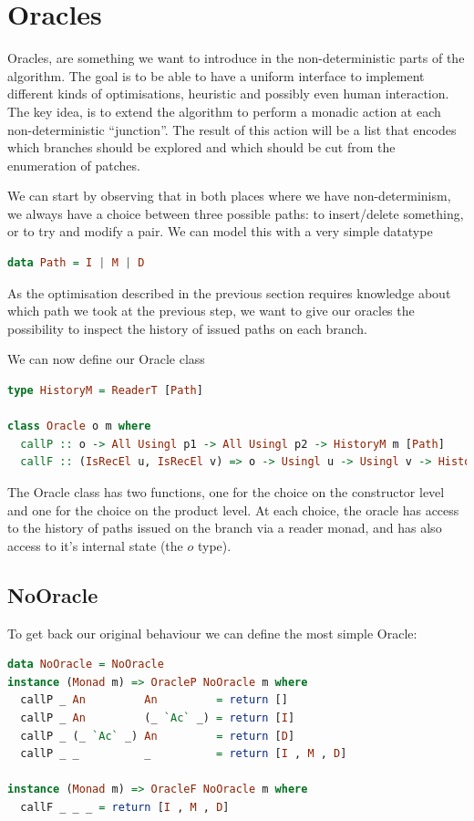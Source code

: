 \documentclass[11pt]{article}
\begin{document}
\section{Oracles}
Oracles, are something we want to introduce in the non-deterministic parts of 
the algorithm. The goal is to be able to have a uniform interface to implement 
different kinds of optimisations, heuristic and possibly even human interaction. 
The key idea, is to extend the algorithm to perform a monadic action at each 
non-deterministic ``junction''. The result of this action will be a list that 
encodes which branches should be explored and which should be cut from the enumeration of patches.

We can start by observing that in both places where we have non-determinism, we always have a 
choice between three possible paths: to insert/delete something, or to try and 
modify a pair. We can model this with a very simple datatype

\begin{lstlisting}[language=haskell]
  data Path = I | M | D 
\end{lstlisting}

As the optimisation described in the previous section requires knowledge about 
which path we took at the previous step, we want to give our oracles the 
possibility to inspect the history of issued paths on each branch.

We can now define our Oracle class

\begin{lstlisting}[language=haskell]
type HistoryM = ReaderT [Path]

class Oracle o m where
  callP :: o -> All Usingl p1 -> All Usingl p2 -> HistoryM m [Path]
  callF :: (IsRecEl u, IsRecEl v) => o -> Usingl u -> Usingl v -> HistoryM m [Path]
\end{lstlisting}

The Oracle class has two functions, one for the choice on the constructor level 
and one for the choice on the product level. At each choice, the oracle has 
access to the history of paths issued on the branch via a reader monad, and 
has also access to it's internal state (the $o$ type).
 
 \subsection{NoOracle}
To get back our original behaviour we can define the most simple Oracle:

\begin{lstlisting}[language=haskell]
data NoOracle = NoOracle
instance (Monad m) => OracleP NoOracle m where
  callP _ An         An         = return []
  callP _ An         (_ `Ac` _) = return [I]
  callP _ (_ `Ac` _) An         = return [D]
  callP _ _          _          = return [I , M , D]

instance (Monad m) => OracleF NoOracle m where
  callF _ _ _ = return [I , M , D]
\end{lstlisting}
\end{document}
